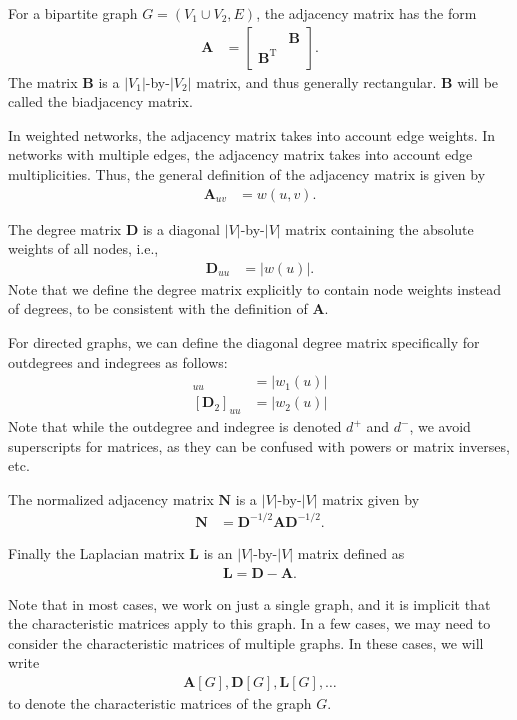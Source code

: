 \documentclass{article}
\begin{document}
For a bipartite graph $G=(V_1 \cup V_2, E)$, the adjacency matrix has
the form 
\begin{align}
  \mathbf A &= \left[ \begin{array}{cc} & \mathbf B \\
      \mathbf B^{\mathrm T} & \end{array} \right].
\end{align}
The matrix $\mathbf B$ is a $|V_1|$-by-$|V_2|$ matrix, and thus
generally rectangular. $\mathbf B$ will be called the biadjacency
matrix. 

In weighted networks, the adjacency matrix takes into account edge
weights.  In networks with multiple edges, the adjacency matrix takes
into account edge multiplicities. Thus, the general definition of the
adjacency matrix is given by
\begin{align}
  \mathbf A_{uv} &= w(u, v). 
\end{align}

The degree matrix $\mathbf D$ is a diagonal $|V|$-by-$|V|$ matrix containing
the absolute weights of all nodes, i.e.,
\begin{align}
  \mathbf D_{uu} &= |w(u)|. 
\end{align}
Note that we define the degree matrix explicitly to contain node weights
instead of degrees, to be consistent with the definition of $\mathbf
A$. 

For directed graphs, we can define the diagonal degree matrix
specifically for outdegrees and indegrees as follows:
\begin{align}
  [\mathbf D_1]_{uu} &= |w_1(u)| \\
  [\mathbf D_2]_{uu} &= |w_2(u)| 
\end{align}
Note that while the outdegree and indegree is denoted $d^+$ and $d^-$, we
avoid superscripts for matrices, as they can be confused with powers or
matrix inverses, etc. 

The normalized adjacency matrix $\mathbf N$ is a $|V|$-by-$|V|$ matrix
given by
\begin{align}
  \mathbf N &= \mathbf D^{-1/2} \mathbf A \mathbf D^{-1/2}. 
\end{align}

Finally the Laplacian matrix $\mathbf L$ is an $|V|$-by-$|V|$ matrix
defined as
\begin{align}
  \mathbf L = \mathbf D - \mathbf A. 
\end{align}

Note that in most cases, we work on just a single graph, and it is
implicit that the characteristic matrices apply to this graph.  In a few
cases, we may need to consider the characteristic matrices of multiple
graphs.  In these cases, we will write
\begin{align*}
  \mathbf A[G], \mathbf D[G], \mathbf L[G], \dotsc
\end{align*}
to denote the characteristic matrices of the graph $G$. 
\end{document}
